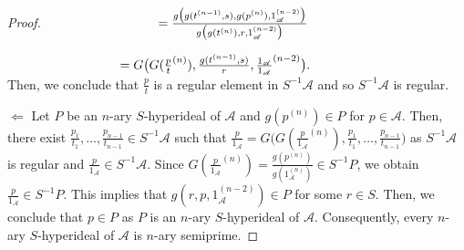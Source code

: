 \documentclass[preprint,review,10pt]{amsart}
\theoremstyle{definition}
\theoremstyle{remark}
\numberwithin{equation}{section}
\begin{document}
\begin{proof}
$\hspace{3.1cm}=\frac{g \big(g(t^{(n-1)},s),g(p^{(n)}),1_\mathscr{A}^{(n-2)}\big)}{g \big ( g(t^{(n)}),r, 1_\mathscr{A}^{(n-2)} \big)}$

$\hspace{3.1cm}=G \big(G(\frac{p}{t}^{(n)}), \frac{g(t^{(n-1)},s)}{r},\frac{1_\mathscr{A}}{1_\mathscr{A}}^{(n-2)}\big).$\\




Then, we conclude that $\frac{p}{t}$ is a regular element in $S^{-1}\mathscr{A}$ and so  $S^{-1}\mathscr{A}$ is regular. 

$\Longleftarrow$  Let  $P$ be an $n$-ary $S$-hyperideal of $\mathscr{A}$  and $g(p^{(n)}) \in P$ for $p \in \mathscr{A}$. Then, there exist $\frac{p_1}{t_1}, \ldots, \frac{p_{n-1}}{t_{n-1}} \in S^{-1}\mathscr{A}$ such that $\frac{p}{1_\mathscr{A}}=G \big(G(\frac{p}{1_\mathscr{A}}^{(n)}), \frac{p_1}{t_1}, \ldots, \frac{p_{n-1}}{t_{n-1}} \big)$  
  as $S^{-1}\mathscr{A}$ is regular and $\frac{p}{1_\mathscr{A}} \in S^{-1}\mathscr{A}$. Since $G(\frac{p}{1_\mathscr{A}}^{(n)})=\frac{g(p^{(n)})}{g(1_\mathscr{A}^{(n)})} \in S^{-1}P$, we obtain $\frac{p}{1_\mathscr{A}}  \in S^{-1}P$. This implies that $g(r,p,1_\mathscr{A}^{(n-2)}) \in P$ for some $r \in S$. Then, we conclude that $p \in P$ as $P$ is an $n$-ary $S$-hyperideal of $\mathscr{A}$. Consequently, every $n$-ary $S$-hyperideal of $\mathscr{A}$ is $n$-ary semiprime. 
\end{proof}
\end{document}
